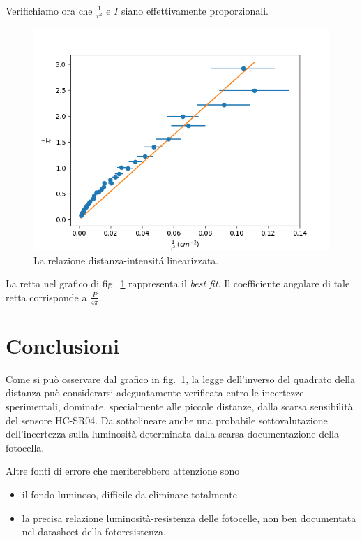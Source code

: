 \documentclass[11pt]{article}
\makeatletter
\def\maxwidth{\ifdim\Gin@nat@width>\linewidth\linewidth
    \else\Gin@nat@width\fi}
\let\Oldincludegraphics\includegraphics
\renewcommand{\includegraphics}[1]{\Oldincludegraphics[width=.8\maxwidth]{#1}}
\makeatother
\begin{document}
    Verifichiamo ora che \(\frac{1}{r^2}\) e \(I\) siano effettivamente proporzionali.

\begin{figure}[H]
  \centering
  \includegraphics{img/inverse-square-law}
  \caption{La relazione distanza-intensit\'a linearizzata.\label{fig:inverse-square-law}}
\end{figure}

La retta nel grafico di fig.~\ref{fig:inverse-square-law} rappresenta il \emph{best fit}.
Il coefficiente angolare di
tale retta corrisponde a \(\frac{P}{4\pi}\).

    \hypertarget{conclusioni}{%
\section{Conclusioni}\label{conclusioni}}

Come si può osservare dal grafico in fig.~\ref{fig:inverse-square-law}, la legge dell'inverso del
quadrato della distanza può considerarsi adeguatamente verificata entro le incertezze
sperimentali, dominate, specialmente alle piccole distanze, dalla scarsa
sensibilità del sensore HC-SR04. Da sottolineare anche una probabile
sottovalutazione dell'incertezza sulla luminosità determinata dalla
scarsa documentazione della fotocella.

Altre fonti di errore che meriterebbero attenzione sono
\begin{itemize}
  \item il fondo luminoso, difficile da
eliminare totalmente
  \item la precisa relazione luminosit\`a-resistenza delle
fotocelle, non ben documentata nel datasheet della fotoresistenza.
\end{itemize}





    
\end{document}
